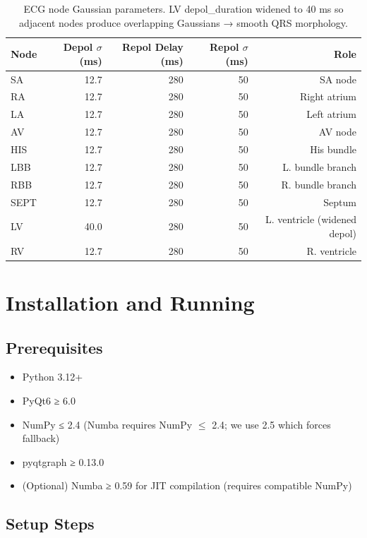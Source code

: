 \documentclass[12pt,a4paper,oneside]{book}
\begin{document}
\begin{table}[H]
    \centering
    \small
    \begin{tabular}{|l|r|r|r|r|}
    \hline
    \textbf{Node} & \textbf{Depol $\sigma$ (ms)} & \textbf{Repol Delay (ms)} & \textbf{Repol $\sigma$ (ms)} & \textbf{Role} \\
    \hline
    SA & 12.7 & 280 & 50 & SA node \\
    RA & 12.7 & 280 & 50 & Right atrium \\
    LA & 12.7 & 280 & 50 & Left atrium \\
    AV & 12.7 & 280 & 50 & AV node \\
    HIS & 12.7 & 280 & 50 & His bundle \\
    LBB & 12.7 & 280 & 50 & L. bundle branch \\
    RBB & 12.7 & 280 & 50 & R. bundle branch \\
    SEPT & 12.7 & 280 & 50 & Septum \\
    LV & 40.0 & 280 & 50 & L. ventricle (widened depol) \\
    RV & 12.7 & 280 & 50 & R. ventricle \\
    \hline
    \end{tabular}
    \caption{ECG node Gaussian parameters. LV depol\_duration widened to 40 ms so adjacent nodes produce overlapping Gaussians → smooth QRS morphology.}
    \label{tab:ecg_nodes}
\end{table}

\section{Installation and Running}

\subsection{Prerequisites}

\begin{itemize}
    \item Python 3.12+
    \item PyQt6 ≥ 6.0
    \item NumPy ≤ 2.4 (Numba requires NumPy $\le$ 2.4; we use 2.5 which forces fallback)
    \item pyqtgraph ≥ 0.13.0
    \item (Optional) Numba ≥ 0.59 for JIT compilation (requires compatible NumPy)
\end{itemize}

\subsection{Setup Steps}
\end{document}
